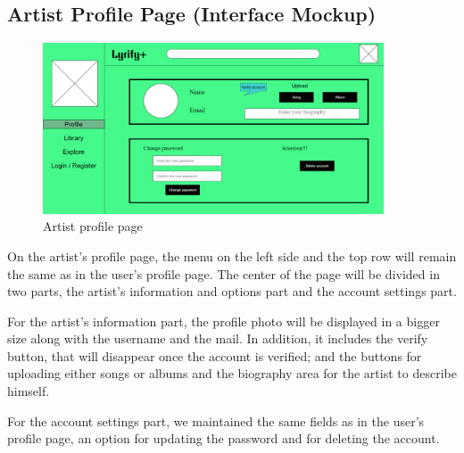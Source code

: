\subsection{Artist Profile Page (Interface Mockup)}

\begin{figure}[h!]
\centering
\includegraphics[width=0.9\textwidth]{sections/PLL/ProfilePageArtistMockup.png}
\caption{Artist profile page}
\end{figure}

On the artist’s profile page, the menu on the left side and the top row will remain the same as in the user’s profile page. The center of the page will be divided in two parts, the artist’s information and options part and the account settings part. 

For the artist’s information part, the profile photo will be displayed in a bigger size along with the username and the mail. In addition, it includes the verify button, that will disappear once the account is verified; and the buttons for uploading either songs or albums and the biography area for the artist to describe himself.

For the account settings part, we maintained the same fields as in the user’s profile page, an option for updating the password and for deleting the account.